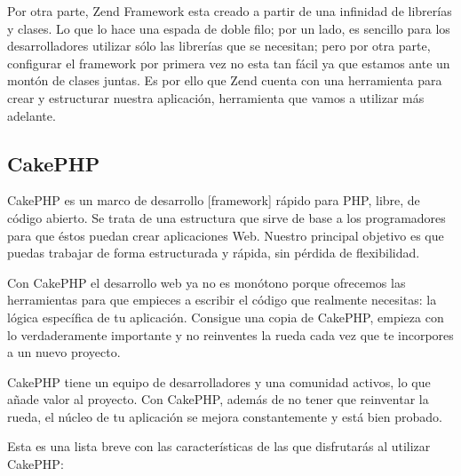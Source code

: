 Por otra parte, Zend Framework esta creado a partir de una infinidad de librerías y clases. Lo que lo hace una espada de doble filo; por un lado, es sencillo para los desarrolladores utilizar sólo las librerías que se necesitan; pero por otra parte, configurar el framework por primera vez no esta tan fácil ya que estamos ante un montón de clases juntas. Es por ello que Zend cuenta con una herramienta para crear y estructurar nuestra aplicación, herramienta que vamos a utilizar más adelante.

\subsection{CakePHP}

CakePHP es un marco de desarrollo [framework] rápido para PHP, libre, de código abierto. Se trata de una estructura que sirve de base a los programadores para que éstos puedan crear aplicaciones Web. Nuestro principal objetivo es que puedas trabajar de forma estructurada y rápida, sin pérdida de flexibilidad.

Con CakePHP el desarrollo web ya no es monótono porque ofrecemos las herramientas para que empieces a escribir el código que realmente necesitas: la lógica específica de tu aplicación. Consigue una copia de CakePHP, empieza con lo verdaderamente importante y no reinventes la rueda cada vez que te incorpores a un nuevo proyecto.

CakePHP tiene un equipo de desarrolladores y una comunidad activos, lo que añade valor al proyecto. Con CakePHP, además de no tener que reinventar la rueda, el núcleo de tu aplicación se mejora constantemente y está bien probado.

Esta es una lista breve con las características de las que disfrutarás al utilizar CakePHP:

